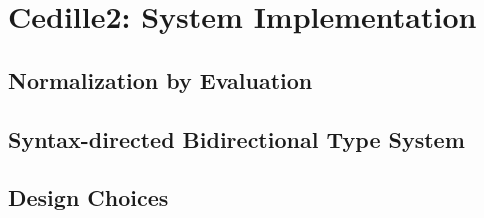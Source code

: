 \chapter{Cedille2: System Implementation}
\label{chap:6}


\section{Normalization by Evaluation}

\section{Syntax-directed Bidirectional Type System}

\section{Design Choices}
